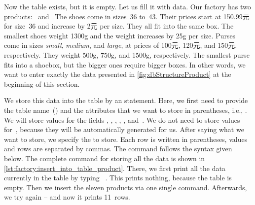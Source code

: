 %
%
%
Now the table  exists, but it is empty.
Let us fill it with data.
Our factory has two products:~ and~
The shoes come in sizes~36 to~43.
Their prices start at 150.99元 for size~36 and increase by 2元 per size.
They all fit into the same box.
The smallest shoes weight 1300g and the weight increases by 25g per size.
Purses come in sizes \emph{small}, \emph{medium}, and \emph{large}, at prices of 100元, 120元, and 150元, respectively.
They weight 500g, 750g, and 1500g, respectively.
The smallest purse fits into a shoebox, but the bigger ones require bigger boxes.
In other words, we want to enter exactly the data presented in \cref{fig:dbStructureProduct} at the beginning of this section.

We store this data into the table  by an  statement.
Here, we first need to provide the table name~() and the attributes that we want to store in parentheses, i.e., .
We will store values for the fields , , , , , and~.
We do not need to store values for~, because they will be automatically generated for us.
After saying what we want to store, we specify the  to store.
Each row is written in parentheses, values and rows are separated by commas.
The command follows the syntax given below.%
%
%
%
%
%
%
%
%
%
The complete command for storing all the data is shown in \cref{lst:factory:insert_into_table_product}.
There, we first print all the data currently in the table by typing \sqlIdx{*}~\cite{PGDG:PD:SC:S}.
This prints nothing, because the table is empty.
Then we insert the eleven products via one single  command.
Afterwards, we try \sqlIdx{*} again -- and now it prints 11~rows.

